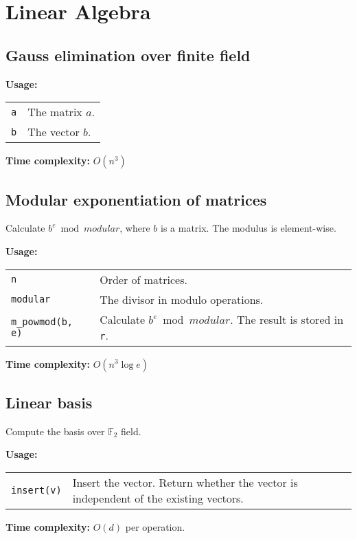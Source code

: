 \section{Linear Algebra}
\subsection{Gauss elimination over finite field}
\textbf{Usage:} \\[0.1cm]
\begin{tabular}{p{3cm} p{8.5cm}}
  \lstinline|a| & The matrix $a$. \\
  \lstinline|b| & The vector $b$. \\
\end{tabular} \par
\textbf{Time complexity:} $O(n^3)$ \par


\subsection{Modular exponentiation of matrices}
Calculate $b^e \bmod modular$, where $b$ is a matrix. The modulus is element-wise.\par
\textbf{Usage:} \\[0.1cm]
\begin{tabular}{p{3cm} p{8.5cm}}
  \lstinline|n| & Order of matrices. \\
  \lstinline|modular| & The divisor in modulo operations. \\
  \lstinline|m_powmod(b, e)| & Calculate $b^e \bmod modular$. The result is stored in \lstinline|r|.
\end{tabular} \par
\textbf{Time complexity:} $O(n^3 \log e)$ \par


\subsection{Linear basis}
Compute the basis over $\mathbb{F}_2$ field. \par
\textbf{Usage:} \\[0.1cm]
\begin{tabular}{p{2cm} p{9.5cm}}
  \lstinline|insert(v)| & Insert the vector. Return whether the vector is independent of the existing vectors. \\
\end{tabular} \par
\textbf{Time complexity:} $O(d)$ per operation. \par



